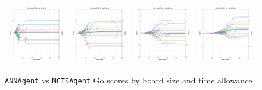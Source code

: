 \begin{figure}
\begin{tabular}{cccc}
\hspace{-0.5cm}\includegraphics[width = 1.55in]{images/Visualizations/ANNvsMCTS/8000ms5x5.png} &
\hspace{-0.5cm}\includegraphics[width = 1.55in]{images/Visualizations/ANNvsMCTS/8000ms7x7.png} &
\hspace{-0.5cm}\includegraphics[width = 1.55in]{images/Visualizations/ANNvsMCTS/8000ms9x9.png} &
\hspace{-0.5cm}\includegraphics[width = 1.55in]{images/Visualizations/ANNvsMCTS/8000ms11x11.png} \\
\end{tabular}
\caption{\texttt{ANNAgent} vs \texttt{MCTSAgent} Go scores by board size and time allowance}
\label{app:annmctsscore}
\end{figure}

